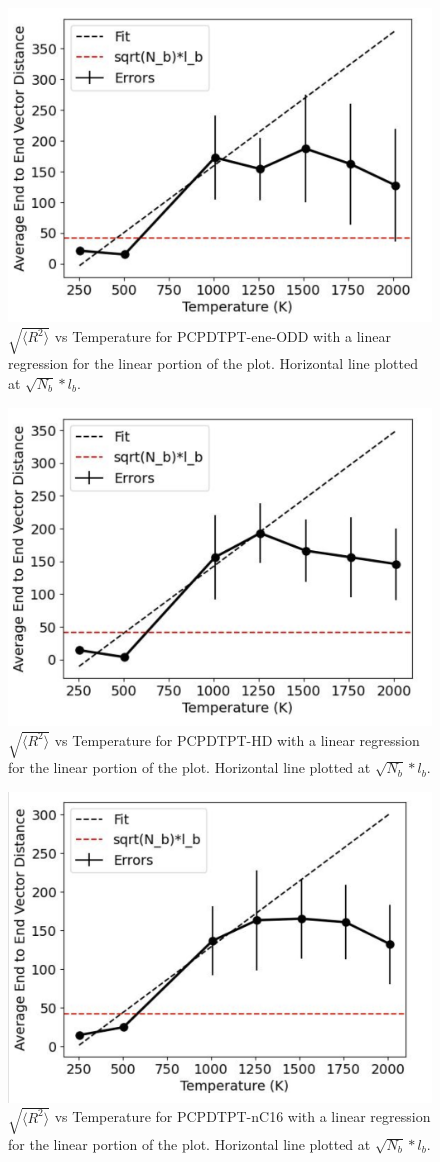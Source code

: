 \begin{figure}
    \centering
    \includegraphics[width=0.6\linewidth]{src/figures/pers_l_figs/e-e plots/ene_ODD.png}
    \caption{$\sqrt{\langle R^2 \rangle}$ vs Temperature for PCPDTPT-ene-ODD with a linear regression for the linear portion of the plot. Horizontal line plotted at $\sqrt{N_b}*l_b$.}
    \label{fig:e-e_ene_ODD}
\end{figure}

\begin{figure}
    \centering
    \includegraphics[width=0.6\linewidth]{src/figures/pers_l_figs/e-e plots/HD.png}
    \caption{$\sqrt{\langle R^2 \rangle}$ vs Temperature for PCPDTPT-HD with a linear regression for the linear portion of the plot. Horizontal line plotted at $\sqrt{N_b}*l_b$.}
    \label{fig:e-e_HD}
\end{figure}

\begin{figure}
    \centering
    \includegraphics[width=0.6\linewidth]{src/figures/pers_l_figs/e-e plots/nC16.png}
    \caption{$\sqrt{\langle R^2 \rangle}$ vs Temperature for PCPDTPT-nC16 with a linear regression for the linear portion of the plot. Horizontal line plotted at $\sqrt{N_b}*l_b$.}
    \label{fig:e-e_nC16}
\end{figure}

